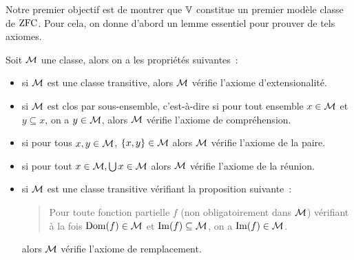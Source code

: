 Notre premier objectif est de montrer que $\mathbb V$ constitue un premier modèle
classe de $\operatorname{ZFC}$. Pour cela, on donne d'abord un lemme essentiel pour prouver de
tels axiomes.

\begin{lemma}\label{lem.axZFC}
  Soit $\mathcal{M}$ une classe, alors on a les propriétés suivantes~:
  \begin{itemize}
  \item si $\mathcal{M}$ est une classe transitive, alors $\mathcal{M}$ vérifie l'axiome
    d'extensionalité.
  \item si $\mathcal{M}$ est clos par sous-ensemble, c'est-à-dire si pour tout
    ensemble $x \in \mathcal{M}$ et $y \subseteq x$, on a $y \in \mathcal{M}$, alors
    $\mathcal{M}$ vérifie l'axiome de compréhension.
  \item si pour tous $x,y \in \mathcal{M}$, $\{x,y\} \in \mathcal{M}$ alors $\mathcal{M}$
    vérifie l'axiome de la paire.
  \item si pour tout $x \in \mathcal{M}, \bigcup x \in \mathcal{M}$ alors $\mathcal{M}$ vérifie
    l'axiome de la réunion.
  \item si $\mathcal{M}$ est une classe transitive vérifiant la proposition
    suivante~:
    \begin{quotation}
      \noindent
      Pour toute fonction partielle $f$ (non obligatoirement dans $\mathcal{M}$)
      vérifiant à la fois $\operatorname{Dom}(f) \in \mathcal{M}$ et $\operatorname{Im}(f) \subseteq \mathcal{M}$,
      on a $\operatorname{Im}(f) \in \mathcal{M}$.
    \end{quotation}
    alors $\mathcal{M}$ vérifie l'axiome de remplacement.
  \end{itemize}
\end{lemma}

